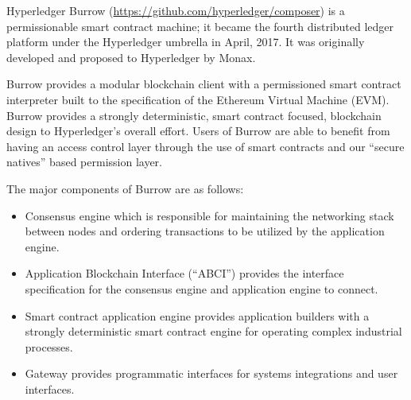 Hyperledger Burrow (\url{https://github.com/hyperledger/composer}) is a permissionable smart contract machine; it became the fourth distributed ledger platform under the Hyperledger umbrella in April, 2017. It was originally developed and proposed to Hyperledger by Monax.

Burrow provides a modular blockchain client with a permissioned smart contract interpreter built to the specification of the Ethereum Virtual Machine (EVM). Burrow provides a strongly deterministic, smart contract focused, blockchain design to Hyperledger's overall effort. Users of Burrow are able to benefit from having an access control layer through the use of smart contracts and our “secure natives” based permission layer.

The major components of Burrow are as follows:
\begin{itemize}
\item Consensus engine which is responsible for maintaining the networking stack between nodes and ordering transactions to be utilized by the application engine.
\item Application Blockchain Interface (“ABCI”) provides the interface specification for the consensus engine and application engine to connect.
\item Smart contract application engine provides application builders with a strongly deterministic smart contract engine for operating complex industrial processes.
\item Gateway provides programmatic interfaces for systems integrations and user interfaces.
\end{itemize}
